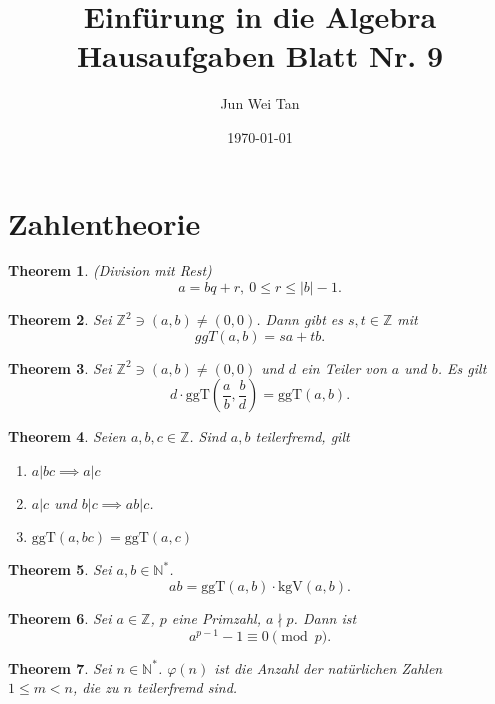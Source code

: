 \documentclass[prb,12pt]{revtex4-2}
\newtheorem{Theorem}{Theorem}
\theoremstyle{definition}
\theoremstyle{definition}
\newenvironment{parts}{\begin{enumerate}[label=(\alph*)]}{\end{enumerate}}
\newcommand{\N}{\mathbb{N}}
\newcommand{\Z}{\mathbb{Z}}
\begin{document}
	\title{Einf\"{u}rung in die Algebra Hausaufgaben Blatt Nr. 9}
	\author{Jun Wei Tan}
	\date{\today}
	\maketitle
	\section{Zahlentheorie}
	\begin{Theorem}
		(Division mit Rest)
	\[
	a=bq+r,~0\le r\le |b|-1
	.\] 
\end{Theorem}
\begin{Theorem}
	Sei $\Z^2\ni (a,b)\neq (0,0)$. Dann gibt es $s,t\in \Z$ mit
	\[
	ggT(a,b)=sa+tb
	.\] 
\end{Theorem}
\begin{Theorem}
	Sei $\Z^2\ni (a,b)\neq (0,0)$ und $d$ ein Teiler von $a$ und $b$. Es gilt
	\[
		d\cdot \text{ggT}\left( \frac{a}{b},\frac{b}{d} \right) =\text{ggT}(a,b)
	.\] 
\end{Theorem}
\begin{Theorem}
	Seien $a,b,c\in \Z$. Sind $a,b$ teilerfremd, gilt
	\begin{parts}
		\item $a|bc\implies a|c$ 
		\item $a|c$ und $b|c\implies ab|c$.
		\item $\text{ggT}(a,bc)=\text{ggT}(a,c)$
	\end{parts}
\end{Theorem}
\begin{Theorem}
	Sei $a,b\in \N^*$.
	\[
		ab=\text{ggT}(a,b)\cdot \text{kgV}(a,b)
	.\] 
\end{Theorem}
\begin{Theorem}
	 Sei $a\in \Z$, $p$ eine Primzahl, $a\nmid p$. Dann ist
	 \[
		 a^{p-1}-1\equiv 0\pmod{p}
	 .\] 
\end{Theorem}
\begin{Theorem}
	Sei $n\in \N^*$. $\varphi(n)$ ist die Anzahl der natürlichen Zahlen $1\le m < n$, die zu $n$ teilerfremd sind.
\end{Theorem}
\end{document}
